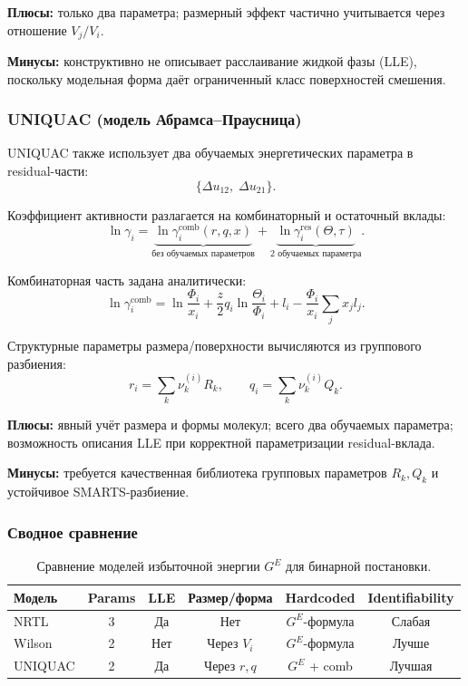 \documentclass[11pt]{article}
\begin{document}
\textbf{Плюсы:} только два параметра; размерный эффект частично учитывается через отношение $V_j/V_i$.

\textbf{Минусы:} конструктивно не описывает расслаивание жидкой фазы (LLE), поскольку модельная форма даёт ограниченный класс поверхностей смешения.

\subsubsection{UNIQUAC (модель Абрамса--Праусница)}

UNIQUAC также использует два обучаемых энергетических параметра в residual-части:
\begin{equation*}
\{\Delta u_{12},\; \Delta u_{21}\}.
\end{equation*}

Коэффициент активности разлагается на комбинаторный и остаточный вклады:
\begin{equation*}
\ln\gamma_i = \underbrace{\ln\gamma_i^{\text{comb}}(r,q,x)}_{\text{без обучаемых параметров}}
+ \underbrace{\ln\gamma_i^{\text{res}}(\Theta,\tau)}_{\text{2 обучаемых параметра}}.
\end{equation*}

Комбинаторная часть задана аналитически:
\begin{equation*}
\ln\gamma_i^{\text{comb}} = \ln\frac{\Phi_i}{x_i}
+ \frac{z}{2}q_i\ln\frac{\Theta_i}{\Phi_i} + l_i
- \frac{\Phi_i}{x_i}\sum_j x_jl_j.
\end{equation*}

Структурные параметры размера/поверхности вычисляются из группового разбиения:
\begin{equation*}
r_i = \sum_k \nu_k^{(i)}R_k, \qquad q_i = \sum_k \nu_k^{(i)}Q_k.
\end{equation*}

\textbf{Плюсы:} явный учёт размера и формы молекул; всего два обучаемых параметра; возможность описания LLE при корректной параметризации residual-вклада.

\textbf{Минусы:} требуется качественная библиотека групповых параметров $R_k,Q_k$ и устойчивое SMARTS-разбиение.

\subsubsection{Сводное сравнение}

\begin{table}[H]
\centering
\begin{tabular}{lccccc}
\hline
Модель & Params & LLE & Размер/форма & Hardcoded & Identifiability \\
\hline
NRTL & 3 & Да & Нет & $G^E$-формула & Слабая \\
Wilson & 2 & Нет & Через $V_i$ & $G^E$-формула & Лучше \\
UNIQUAC & 2 & Да & Через $r,q$ & $G^E$ + comb & Лучшая \\
\hline
\end{tabular}
\caption{Сравнение моделей избыточной энергии $G^E$ для бинарной постановки.}
\end{table}
\end{document}
